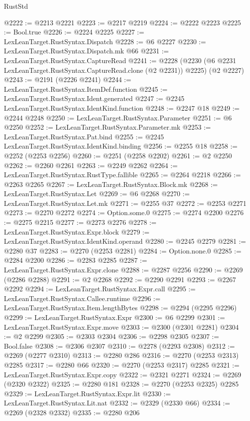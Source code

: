 \begin{lexlean}{RustStd}
\begin{coremodule}
@2222 := @2213 @2221
@2223 := @2217 @2219
@2224 := @2222 @2223
@2225 := Bool.true
@2226 := @2224 @2225
@2227 := LexLeanTarget.RustSyntax.Dispatch
@2228 := @6 @2227
@2230 := LexLeanTarget.RustSyntax.Dispatch.mk @66
@2231 := LexLeanTarget.RustSyntax.CaptureRead
@2241 := @2228
    (@2230 (@6 @2231 LexLeanTarget.RustSyntax.CaptureRead.clone (@2 @2231)) @2225)
    (@2 @2227)
@2243 := @2191 (@2226 @2241)
@2244 := LexLeanTarget.RustSyntax.ItemDef.function
@2245 := LexLeanTarget.RustSyntax.Ident.generated
@2247 := @2245 LexLeanTarget.RustSyntax.IdentKind.function
@2248 := @2247 @18
@2249 := @2244 @2248
@2250 := LexLeanTarget.RustSyntax.Parameter
@2251 := @6 @2250
@2252 := LexLeanTarget.RustSyntax.Parameter.mk
@2253 := LexLeanTarget.RustSyntax.Pat.bind
@2255 := @2245 LexLeanTarget.RustSyntax.IdentKind.binding
@2256 := @2255 @18
@2258 := @2252 (@2253 @2256)
@2260 := @2251 (@2258 @2202)
@2261 := @2 @2250
@2262 := @2260 @2261
@2263 := @2249 @2262
@2264 := LexLeanTarget.RustSyntax.RustType.fallible
@2265 := @2264 @2218
@2266 := @2263 @2265
@2267 := LexLeanTarget.RustSyntax.Block.mk
@2268 := LexLeanTarget.RustSyntax.Let
@2269 := @6 @2268
@2270 := LexLeanTarget.RustSyntax.Let.mk
@2271 := @2255 @37
@2272 := @2253 @2271
@2273 := @2270 @2272
@2274 := Option.some.{0}
@2275 := @2274 @2200
@2276 := @2275 @2215
@2277 := @2273 @2276
@2278 := LexLeanTarget.RustSyntax.Expr.block
@2279 := LexLeanTarget.RustSyntax.IdentKind.operand
@2280 := @2245 @2279
@2281 := @2280 @37
@2283 := @2270 (@2253 @2281)
@2284 := Option.none.{0}
@2285 := @2284 @2200
@2286 := @2283 @2285
@2287 := LexLeanTarget.RustSyntax.Expr.clone
@2288 := @2287 @2256
@2290 := @2269 (@2286 @2288)
@2291 := @2 @2268
@2292 := @2290 @2291
@2293 := @2267 @2292
@2294 := LexLeanTarget.RustSyntax.Expr.call
@2295 := LexLeanTarget.RustSyntax.Callee.runtime
@2296 := LexLeanTarget.RustSyntax.Item.lengthBytes
@2298 := @2294 (@2295 @2296)
@2299 := LexLeanTarget.RustSyntax.Expr
@2300 := @6 @2299
@2301 := LexLeanTarget.RustSyntax.Expr.move
@2303 := @2300 (@2301 @2281)
@2304 := @2 @2299
@2305 := @2303 @2304
@2306 := @2298 @2305
@2307 := Bool.false
@2308 := @2306 @2307
@2310 := @2278 (@2293 @2308)
@2312 := @2269 (@2277 @2310)
@2313 := @2280 @286
@2316 := @2270 (@2253 @2313) @2285
@2317 := @2280 @66
@2320 := @2270 (@2253 @2317) @2285
@2321 := LexLeanTarget.RustSyntax.Expr.copy
@2322 := @2321 @2271
@2324 := @2269 (@2320 @2322)
@2325 := @2280 @181
@2328 := @2270 (@2253 @2325) @2285
@2329 := LexLeanTarget.RustSyntax.Expr.lit
@2330 := LexLeanTarget.RustSyntax.Lit.nat
@2332 := @2329 (@2330 @66)
@2334 := @2269 (@2328 @2332)
@2335 := @2280 @206

\end{coremodule}
\end{lexlean}
